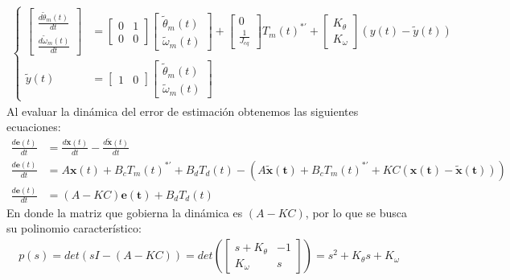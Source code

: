 \documentclass[a4paper, 10pt, onecolumn,journal]{ieeeconf}
\begin{document}
\begin{align}
	\begin{cases}
		\begin{bmatrix}
			\frac{d \tilde{\theta}_m(t)}{dt} \\ 
			\frac{d \tilde{\omega}_m(t)}{dt}
		\end{bmatrix} &= 
		\begin{bmatrix}
			0 & 1 \\ 
			0 & 0
		\end{bmatrix}
		\begin{bmatrix}
			{\tilde{\theta}}_m(t) \\ 
			{\tilde{\omega}}_m(t)
		\end{bmatrix} + 
		\begin{bmatrix}
			0 \\ 
			\frac{1}{J_{eq}}
		\end{bmatrix} {T_m(t)}^{*'} + 
		\begin{bmatrix}
			K_{\theta} \\
			K_{\omega}
		\end{bmatrix} \left(y(t) - \tilde{y}(t) \right) \\
		\tilde{y}(t) &= \begin{bmatrix}
			1 & 0
		\end{bmatrix} 
		\begin{bmatrix}
			{\tilde{\theta}}_m(t) \\ 
			{\tilde{\omega}}_m(t)
		\end{bmatrix}
	\end{cases}\label{ecuacion matricial de observador}
\end{align}
Al evaluar la dinámica del error de estimación obtenemos las siguientes ecuaciones: 
\begin{align}
	\frac{d \mathbf{e}(t)}{dt} &= \frac{d \mathbf{x}(t)}{dt} - \frac{d \mathbf{\tilde{x}} (t)}{dt}\\
	\frac{d \mathbf{e}(t)}{dt} &= A {\mathbf{x}(t)} + B_c {T_m(t)}^{*'} + B_d T_d(t) - \left( A \mathbf{\tilde{x} (t)} + B_c {T_m(t)}^{*'} + K C \left(\mathbf{x(t)} - \mathbf{\tilde{x} (t)} \right) \right) \\
	\frac{d \mathbf{e}(t)}{dt} &= \left(A - KC \right) {\mathbf{e(t)}} + B_d T_d(t)\label{dinamica del error de estimacion}
\end{align}
En donde la matriz que gobierna la dinámica es $\left(A - KC \right)$, por lo que se busca su polinomio característico:
\begin{align}
	p(s) = det\left(s I - \left( A - KC\right)  \right) = det\left(\begin{bmatrix}
		s + K_{\theta} & -1 \\ 
		K_{\omega} & s
	\end{bmatrix}  
	 \right) = s^2 + K_{\theta} s + K_{\omega} \label{polinomeo caracteristico de observador}
\end{align}
\end{document}
